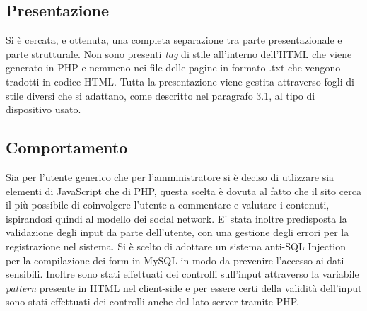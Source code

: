 \subsection{Presentazione}
Si è cercata, e ottenuta, una completa separazione tra parte presentazionale e parte strutturale. Non sono presenti \textit{tag} di stile all’interno dell'HTML che viene generato in PHP e nemmeno nei file delle pagine in formato .txt che vengono tradotti in codice HTML. 
Tutta la presentazione viene gestita attraverso fogli di stile diversi che si adattano, come descritto nel paragrafo 3.1, al tipo di dispositivo usato.

\subsection{Comportamento}
Sia per l'utente generico che per l'amministratore si è deciso di utlizzare sia elementi di JavaScript che di PHP, questa scelta è dovuta al fatto che il sito cerca il più possibile di coinvolgere l'utente a commentare e valutare i contenuti, ispirandosi quindi al modello dei social network. E' stata inoltre predisposta la validazione degli input da parte dell’utente, con una gestione degli errori per la registrazione nel sistema. Si è scelto di adottare un sistema anti-SQL Injection per la compilazione dei form in MySQL in modo da prevenire l'accesso ai dati sensibili. Inoltre sono stati effettuati dei controlli sull'input attraverso la variabile \textit{pattern} presente in HTML nel client-side e per essere certi della validità dell'input sono stati effettuati dei controlli anche dal lato server tramite PHP.


